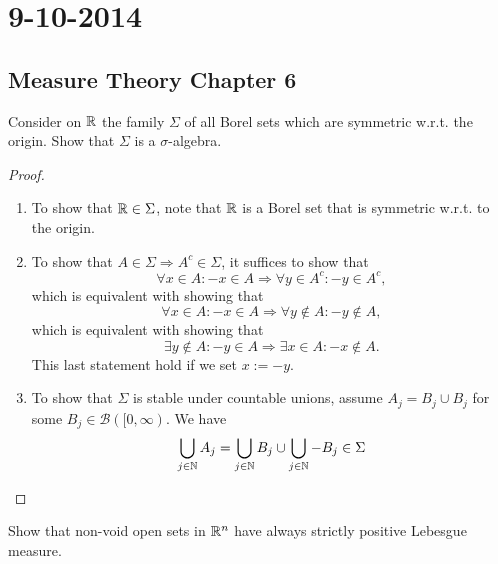 \section{9-10-2014}

\subsection{Measure Theory Chapter 6}


\begin{thm}[Problem 6.1a]
Consider on \(\Bbb{R}\) the family \(\Sigma \) of all Borel sets which are symmetric w.r.t. the origin. Show that \(\Sigma \) is a \(\sigma \)-algebra.
\end{thm}

\begin{proof}

\begin{enumerate}
  \item To show that \(\Bbb{R}\in \Sigma \), note that \(\Bbb{R}\) is a Borel set that is symmetric w.r.t. to the origin.
  \item To show that \(A\in \Sigma \Rightarrow A^c\in \Sigma \), it suffices to show that
\[
\forall x\in A:-x\in A \Longrightarrow  \forall y\in A^c:-y\in A^c,
\]
which is equivalent with showing that
\[
\forall x\in A:-x\in A \Longrightarrow \forall y\not\in A : -y\not\in A,
\]
which is equivalent with showing that
\[
\exists y\not\in A:-y\in A \Longrightarrow \exists x\in A:-x\not\in A.
\]
This last statement hold if we set \(x:=-y.\)
  \item To show that \(\Sigma \) is stable under countable unions, assume \(A_{j}=B_{j}\cup B_{j}\) for some \(B_{j}\in \mathcal{B}([0,\infty )\). We have
\[
\bigcup _{j\in \Bbb{N}}A_{j}=\bigcup _{j\in \Bbb{N}}B_{j}\cup \bigcup _{j\in \Bbb{N}}-B_{j}\in \Sigma 
\]
\end{enumerate}
\end{proof}
%

\newpage
\begin{thm}[Problem 6.3i]
Show that non-void open sets in \(\Bbb{R}^n\) have always strictly positive Lebesgue measure.
\end{thm}

